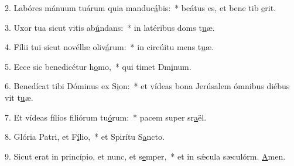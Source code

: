 2. Labóres mánuum tuárum quia manduc\uline{á}bis:~* beátus es, et bene tib \uline{e}rit.\par 
3. Uxor tua sicut vitis ab\uline{ú}ndans:~* in latéribus doms t\uline{u}æ.\par 
4. Fílii tui sicut novéllæ oliv\uline{á}rum:~* in circúitu mens t\uline{u}æ.\par 
5. Ecce sic benedicétur h\uline{o}mo,~* qui timet Dm\uline{i}num.\par 
6. Benedícat tibi Dóminus ex S\uline{i}on:~* et vídeas bona Jerúsalem ómnibus diébus vit t\uline{u}æ.\par 
7. Et vídeas fílios filiórum tu\uline{ó}rum:~* pacem super sr\uline{a}ël.\par 
8. Glória Patri, et F\uline{í}lio,~* et Spirítu S\uline{a}ncto.\par 
9. Sicut erat in princípio, et nunc, et s\uline{e}mper,~* et in sǽcula sæculórm. \uline{A}men.\par 
